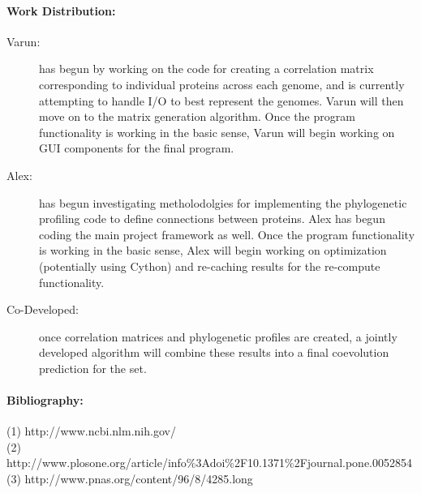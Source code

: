 \documentclass[11pt, oneside]{article}
\begin{document}
\paragraph
{\bfseries Work Distribution:}
\begin{description}

\item[Varun:] has begun by working on the code for creating a correlation matrix corresponding to individual proteins across each genome, and is currently attempting to handle I/O to best represent the genomes. Varun will then move on to the matrix generation algorithm. Once the program functionality is working in the basic sense, Varun will begin working on GUI components for the final program.

\item[Alex:] has begun investigating metholodolgies for implementing the phylogenetic profiling code to define connections between proteins. Alex has begun coding the main project framework as well. Once the program functionality is working in the basic sense, Alex will begin working on optimization (potentially using Cython) and re-caching results for the re-compute functionality.

\item[Co-Developed:] once correlation matrices and phylogenetic profiles are created, a jointly developed algorithm will combine these results into a final coevolution prediction for the set.

\end{description}

\paragraph
{\bfseries Bibliography:} (1) http://www.ncbi.nlm.nih.gov/ \\
(2) http://www.plosone.org/article/info\%3Adoi\%2F10.1371\%2Fjournal.pone.0052854 \\
(3) http://www.pnas.org/content/96/8/4285.long \\
\end{document}
